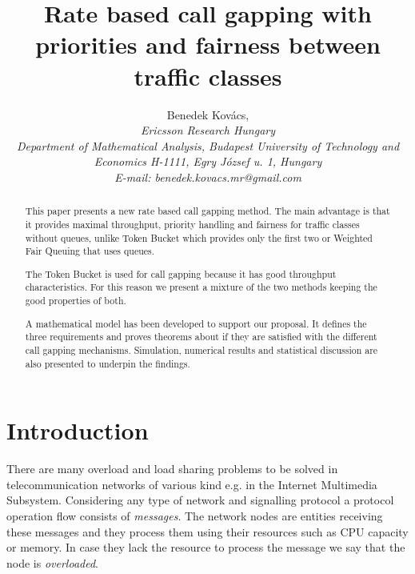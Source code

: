 \documentclass[conference]{IEEEtran}
\newcommand{\comment}[1]{}
\begin{document}
\title{Rate based call gapping with priorities and fairness between traffic classes}

\author{Benedek Kov\'acs,\\
\small\itshape Ericsson Research Hungary\\  Department of
Mathematical Analysis, Budapest University of Technology and
Economics H-1111, Egry J\'ozsef u. 1, Hungary\\
E-mail: benedek.kovacs.mr@gmail.com}

\comment{
\author{Benedek Kov\'acs\\
Ericsson Research Hungary and\\Budapest University of Technology and Economics\\
Email: benedek.kovacs.mr@gmail.com\\
NOT FINAL VERSION}}

\maketitle

\begin{abstract}
This paper presents a new rate based call gapping method. The main
advantage is that it provides maximal throughput, priority handling
and fairness for traffic classes without queues, unlike Token Bucket
which provides only the first two or Weighted Fair Queuing that uses
queues.

The Token Bucket is used for call gapping because it has good
throughput characteristics. For this reason we present a mixture of
the two methods keeping the good properties of both.

A mathematical model has been developed to support our proposal. It
defines the three requirements and proves theorems about if they are
satisfied with the different call gapping mechanisms. Simulation,
numerical results and statistical discussion are also presented to
underpin the findings.
\end{abstract}


\section{Introduction}
There are many overload and load sharing problems to be solved in
telecommunication networks of various kind e.g. in the Internet
Multimedia Subsystem. Considering any type of network and signalling
protocol a protocol operation flow consists of \textit{messages}.
The network nodes are entities receiving these messages and they
process them using their resources such as CPU capacity or memory.
In case they lack the resource to process the message we say that
the node is \textit{overloaded}.
\end{document}
